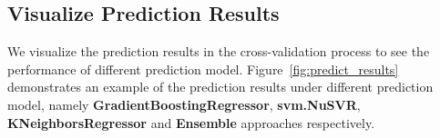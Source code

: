 \documentclass[10pt, oneside]{article}   	%
\begin{document}
\subsection{Visualize Prediction Results}
We visualize the prediction results in the cross-validation process to see the performance of different prediction model. Figure~\ref{fig:predict_results} demonstrates an example of the prediction results under different prediction model, namely \textbf{GradientBoostingRegressor}, \textbf{svm.NuSVR}, \textbf{KNeighborsRegressor} and \textbf{Ensemble} approaches respectively.

\end{document}
